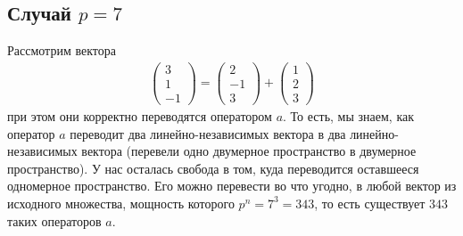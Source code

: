 \subsection{Случай $p = 7$}
Рассмотрим вектора
\begin{gather}
    \begin{pmatrix}
        3 \\ 1 \\ -1
    \end{pmatrix} = 
    \begin{pmatrix}
        2 \\ -1 \\ 3
    \end{pmatrix} + 
    \begin{pmatrix}
        1 \\ 2 \\ 3
    \end{pmatrix}
\end{gather}
при этом они корректно переводятся оператором $a$. То есть, мы знаем, как оператор $a$ переводит два линейно-независимых вектора в два линейно-независимых вектора (перевели одно двумерное пространство в двумерное пространство). У нас осталась свобода в том, куда переводится оставшееся одномерное пространство. Его можно перевести во что угодно, в любой вектор из исходного множества, мощность которого $p^n = 7^3 = 343$, то есть существует $343$ таких операторов $a$.